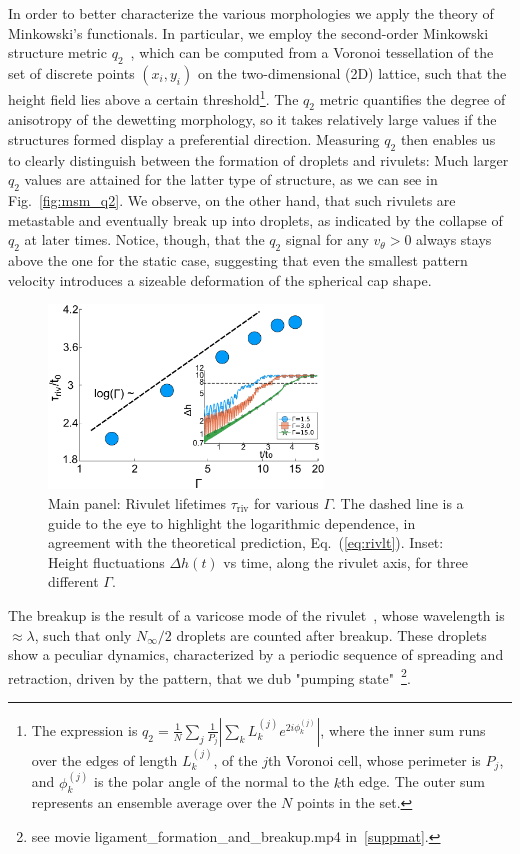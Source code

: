 In order to better characterize the various morphologies we apply the theory of Minkowski's functionals. 
In particular, we employ the second-order Minkowski structure metric $q_2$~\cite{mickelShortcomingsBondOrientational2013, schallerPapaya22DIrreducible2020}, which can be computed from a Voronoi tessellation of the set of discrete points $(x_i, y_i)$ on the two-dimensional (2D) lattice, such that the height field lies above a certain threshold\footnote{The expression is $q_2 = \frac{1}{N}\sum_j \frac{1}{P_j}|\sum_k L^{(j)}_k e^{2i\phi^{(j)}_k}|$, where the inner sum runs over the edges of length $L^{(j)}_k$, of the $j$th Voronoi cell, whose perimeter is $P_j$, and $\phi^{(j)}_k$ is the polar angle of the normal to the $k$th edge. 
The outer sum represents an ensemble average over the $N$ points in the set.}. The $q_2$ metric quantifies the degree of anisotropy of the dewetting morphology, so it takes relatively large values if the structures formed display a preferential direction. 
Measuring $q_2$ then enables us to clearly distinguish between the formation of droplets and rivulets: Much larger $q_2$ values are attained for the latter type of structure, as we can see in Fig.~\ref{fig:msm_q2}.
We observe, on the other hand, that such rivulets are metastable and eventually break up into droplets, as indicated by the collapse of $q_2$ at later times. 
Notice, though, that the $q_2$ signal for any $v_{\theta} >0$ always stays above the one for the static case, suggesting that even the smallest pattern velocity introduces a sizeable deformation of the spherical cap shape.
\begin{figure}
    \centering
    \includegraphics[width=0.65\textwidth]{graphics/Figure_5.pdf}
    \caption{Main panel: Rivulet lifetimes $\tau_{\text{riv}}$ for various $\Gamma$.
    The dashed line is a guide to the eye to highlight the logarithmic dependence, in agreement with the theoretical prediction, Eq.~(\ref{eq:rivlt}).
    Inset: Height fluctuations $\Delta h(t)$ vs time, along the rivulet axis, for three different $\Gamma$.
    }
    \label{fig:stab_ligs_lam2}
\end{figure}
The breakup is the result of a varicose mode of the rivulet~\cite{diezBreakupFluidRivulets2009, mechkovStabilityLiquidRidges2008}, whose wavelength is $\approx\lambda$, such that only $N_{\infty}/2$ droplets are counted after breakup. 
These droplets show a peculiar dynamics, characterized by a periodic sequence of spreading and retraction, driven by the pattern, that we dub "pumping state"~\footnote{see movie ligament\_formation\_and\_breakup.mp4 in~\ref{suppmat}.}.


